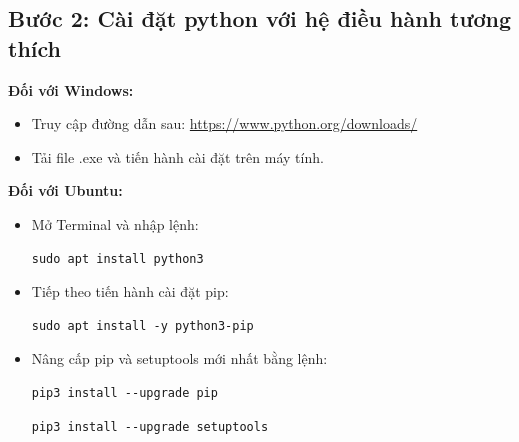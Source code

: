 \documentclass[a4paper]{article}
\newlength{\mylistingwidth}
\begin{document}
\subsection*{Bước 2: Cài đặt python với hệ điều hành tương thích}
\begin{par}
\textbf{Đối với Windows:}  
\begin{itemize}
    \item Truy cập đường dẫn sau: \href{https://www.python.org/downloads/}{https://www.python.org/downloads/}
    \item Tải file .exe và tiến hành cài đặt trên máy tính.
\end{itemize} 
\textbf{Đối với Ubuntu:}
\begin{itemize}
    \item Mở Terminal và nhập lệnh:
    \settowidth{\mylistingwidth}{\ttfamily sudo apt install python3}
    \begin{lstlisting}
sudo apt install python3
    \end{lstlisting}
    
    \item Tiếp theo tiến hành cài đặt pip:
    \settowidth{\mylistingwidth}{\ttfamily sudo apt install -y python3-pip}
    \begin{lstlisting}
sudo apt install -y python3-pip
    \end{lstlisting}
    
    \item Nâng cấp pip và setuptools mới nhất bằng lệnh:
    \settowidth{\mylistingwidth}{\ttfamily pip3 install --upgrade pip }
    \begin{lstlisting}
pip3 install --upgrade pip
    \end{lstlisting}
    
    \settowidth{\mylistingwidth}{\ttfamily pip3 install --upgrade setuptools}
    \begin{lstlisting}
pip3 install --upgrade setuptools
    \end{lstlisting}
\end{itemize}
\end{par}
\end{document}
